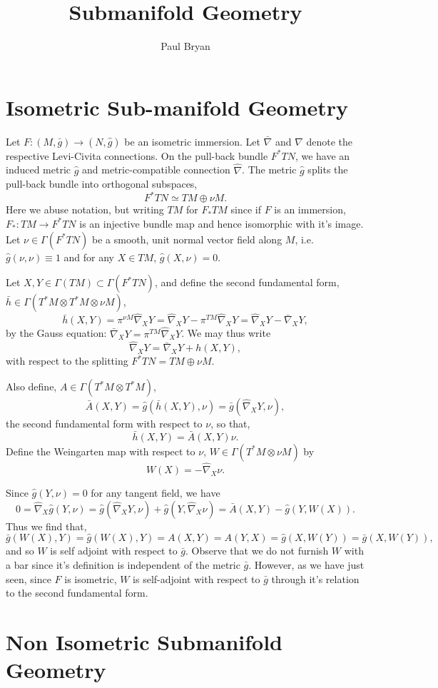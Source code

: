 \documentclass{article}
\title{Submanifold Geometry}
\author{Paul Bryan}
\begin{document}
\maketitle

\section{Isometric Sub-manifold Geometry}

Let $F: (M, \bar{g}) \to (N, \hat{g})$ be an isometric immersion. Let $\bar{\nabla}$ and $\hat{\nabla}$ denote the respective Levi-Civita connections. On the pull-back bundle $F^{\ast} TN$, we have an induced metric $\hat{g}$ and metric-compatible connection $\hat{\nabla}$. The metric $\hat{g}$ splits the  pull-back bundle into orthogonal subspaces,
\[
F^{\ast}TN \simeq TM \oplus \nu M.
\]
Here we abuse notation, but writing $TM$ for $F_{\ast} TM$ since if $F$ is an immersion, $F_{\ast} : TM \to F^{\ast} TN$ is an injective bundle map and hence isomorphic with it's image. Let $\nu \in \Gamma(F^{\ast}TN)$ be a smooth, unit normal vector field along $M$, i.e. $\hat{g}(\nu, \nu) \equiv 1$ and for any $X \in TM$, $\hat{g}(X, \nu) = 0$.

Let $X, Y \in \Gamma(TM) \subset \Gamma(F^{\ast}TN)$, and define the second fundamental form, $\bar{h} \in \Gamma(T^{\ast} M \otimes T^{\ast} M \otimes \nu M)$,
\[
\bar{h}(X, Y) = \pi^{\nu M} \hat{\nabla}_X Y = \hat{\nabla}_X Y - \pi^{TM} \hat{\nabla}_X Y = \hat{\nabla}_X Y - \bar{\nabla}_X Y,
\]
by the Gauss equation: $\bar{\nabla}_X Y = \pi^{TM} \hat{\nabla}_X Y$. We may thus write
\[
\hat{\nabla}_X Y = \bar{\nabla}_X Y + h(X, Y),
\]
with respect to the splitting $F^{\ast}TN = TM \oplus \nu M$.

Also define, $A \in \Gamma(T^{\ast}M \otimes T^{\ast} M)$,
\[
\bar{A}(X, Y) = \hat{g}(\bar{h}(X, Y), \nu) = \bar{g} (\hat{\nabla}_X Y, \nu),
\]
the second fundamental form with respect to $\nu$, so that,
\[
\bar{h}(X, Y) = \bar{A}(X, Y) \nu.
\]
Define the Weingarten map with respect to $\nu$, $W \in \Gamma(T^{\ast}M \otimes \nu M)$ by
\[
W(X) = - \hat{\nabla}_X \nu.
\]

Since $\hat{g}(Y, \nu) = 0$ for any tangent field, we have
\[
0 = \hat{\nabla}_X \hat{g} (Y, \nu) = \hat{g}(\hat{\nabla}_X Y, \nu) + \hat{g} (Y, \hat{\nabla}_X \nu) = \bar{A}(X, Y) - \hat{g}(Y, W(X)).
\]
Thus we find that,
\[
\bar{g} (W(X), Y) = \hat{g} (W(X), Y) = A(X, Y) = A(Y, X) = \hat{g}(X, W(Y)) = \bar{g}(X, W(Y)),
\]
and so $W$ is self adjoint with respect to $\bar{g}$. Observe that we do not furnish $W$ with a bar since it's definition is independent of the metric $\bar{g}$. However, as we have just seen, since $F$ is isometric, $W$ is self-adjoint with respect to $\bar{g}$ through it's relation to the second fundamental form.

\section{Non Isometric Submanifold Geometry}
\end{document}
